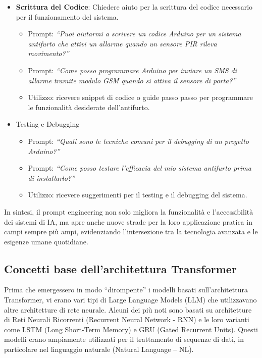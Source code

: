 \begin{itemize}
\begin{itemize}
                    \item \textbf{Scrittura del Codice}: Chiedere aiuto per la scrittura del codice necessario per il funzionamento del sistema.
                    \begin{itemize}
                        \item Prompt: \textit{``Puoi aiutarmi a scrivere un codice Arduino per un sistema antifurto che attivi un allarme quando un sensore PIR rileva movimento?''}
                        \item Prompt: \textit{``Come posso programmare Arduino per inviare un SMS di allarme tramite modulo GSM quando si attiva il sensore di porta?''}
                        \item Utilizzo: ricevere snippet di codice o guide passo passo per programmare le funzionalità desiderate dell'antifurto.
                    \end{itemize}
                    
                    \item Testing e Debugging
                    \begin{itemize}
                        \item Prompt: \textit{``Quali sono le tecniche comuni per il debugging di un progetto Arduino?''}
                        \item Prompt: \textit{``Come posso testare l'efficacia del mio sistema antifurto prima di installarlo?''}
                        \item Utilizzo: ricevere suggerimenti per il testing e il debugging del sistema.
                    \end{itemize}
                \end{itemize}
            \end{itemize}

            In sintesi, il prompt engineering non solo migliora la funzionalità e l'accessibilità dei sistemi di IA, ma apre anche nuove strade per la loro applicazione pratica in campi sempre più ampi, evidenziando l'intersezione tra la tecnologia avanzata e le esigenze umane quotidiane.
            
    \subsection{Concetti base dell'architettura Transformer}
        Prima che emergessero in modo ``dirompente'' i modelli basati sull'architettura Transformer, vi erano vari tipi di Large Language Models (LLM) che utilizzavano altre architetture di rete neurale. Alcuni dei più noti sono basati su architetture di Reti Neurali Ricorrenti (Recurrent Neural Network - RNN) e le loro varianti come LSTM (Long Short-Term Memory) e GRU (Gated Recurrent Units). Questi modelli erano ampiamente utilizzati per il trattamento di sequenze di dati, in particolare nel linguaggio naturale (Natural Language – NL).

